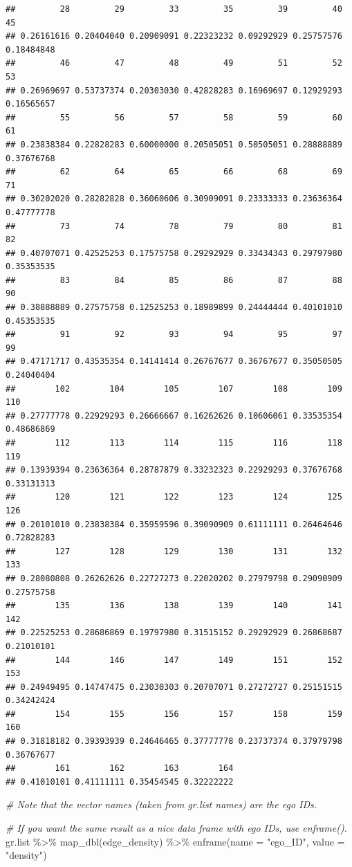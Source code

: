 \documentclass[
]{book}
\newenvironment{Shaded}{\begin{snugshade}}{\end{snugshade}}
\newcommand{\AttributeTok}[1]{\textcolor[rgb]{0.77,0.63,0.00}{#1}}
\newcommand{\CommentTok}[1]{\textcolor[rgb]{0.56,0.35,0.01}{\textit{#1}}}
\newcommand{\FunctionTok}[1]{\textcolor[rgb]{0.00,0.00,0.00}{#1}}
\newcommand{\NormalTok}[1]{#1}
\newcommand{\SpecialCharTok}[1]{\textcolor[rgb]{0.00,0.00,0.00}{#1}}
\newcommand{\StringTok}[1]{\textcolor[rgb]{0.31,0.60,0.02}{#1}}
\begin{document}
\begin{verbatim}
##         28         29         33         35         39         40         45 
## 0.26161616 0.20404040 0.20909091 0.22323232 0.09292929 0.25757576 0.18484848 
##         46         47         48         49         51         52         53 
## 0.26969697 0.53737374 0.20303030 0.42828283 0.16969697 0.12929293 0.16565657 
##         55         56         57         58         59         60         61 
## 0.23838384 0.22828283 0.60000000 0.20505051 0.50505051 0.28888889 0.37676768 
##         62         64         65         66         68         69         71 
## 0.30202020 0.28282828 0.36060606 0.30909091 0.23333333 0.23636364 0.47777778 
##         73         74         78         79         80         81         82 
## 0.40707071 0.42525253 0.17575758 0.29292929 0.33434343 0.29797980 0.35353535 
##         83         84         85         86         87         88         90 
## 0.38888889 0.27575758 0.12525253 0.18989899 0.24444444 0.40101010 0.45353535 
##         91         92         93         94         95         97         99 
## 0.47171717 0.43535354 0.14141414 0.26767677 0.36767677 0.35050505 0.24040404 
##        102        104        105        107        108        109        110 
## 0.27777778 0.22929293 0.26666667 0.16262626 0.10606061 0.33535354 0.48686869 
##        112        113        114        115        116        118        119 
## 0.13939394 0.23636364 0.28787879 0.33232323 0.22929293 0.37676768 0.33131313 
##        120        121        122        123        124        125        126 
## 0.20101010 0.23838384 0.35959596 0.39090909 0.61111111 0.26464646 0.72828283 
##        127        128        129        130        131        132        133 
## 0.28080808 0.26262626 0.22727273 0.22020202 0.27979798 0.29090909 0.27575758 
##        135        136        138        139        140        141        142 
## 0.22525253 0.28686869 0.19797980 0.31515152 0.29292929 0.26868687 0.21010101 
##        144        146        147        149        151        152        153 
## 0.24949495 0.14747475 0.23030303 0.20707071 0.27272727 0.25151515 0.34242424 
##        154        155        156        157        158        159        160 
## 0.31818182 0.39393939 0.24646465 0.37777778 0.23737374 0.37979798 0.36767677 
##        161        162        163        164 
## 0.41010101 0.41111111 0.35454545 0.32222222
\end{verbatim}

\begin{Shaded}
\begin{Highlighting}[]
\CommentTok{\# Note that the vector names (taken from gr.list names) are the ego IDs.}

\CommentTok{\# If you want the same result as a nice data frame with ego IDs, use enframe().}
\NormalTok{gr.list }\SpecialCharTok{\%\textgreater{}\%}
  \FunctionTok{map\_dbl}\NormalTok{(edge\_density) }\SpecialCharTok{\%\textgreater{}\%} 
  \FunctionTok{enframe}\NormalTok{(}\AttributeTok{name =} \StringTok{"ego\_ID"}\NormalTok{, }\AttributeTok{value =} \StringTok{"density"}\NormalTok{)}
\end{Highlighting}
\end{Shaded}
\end{document}
